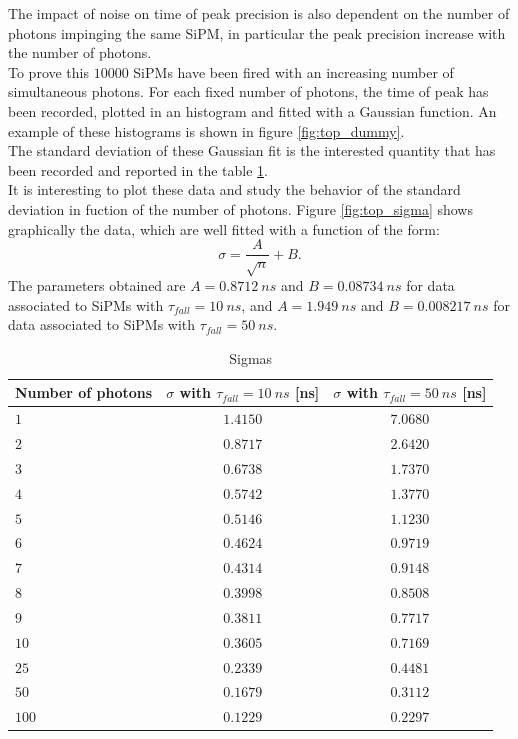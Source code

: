 The impact of noise on time of peak precision is also dependent on the number of photons impinging the same SiPM, in particular the peak precision increase with the number of photons.\\
To prove this $10000$ SiPMs have been fired with an increasing number of simultaneous photons. For each fixed number of photons, the time of peak has been recorded, plotted in an histogram and fitted with a Gaussian function. An example of these histograms is shown in figure \ref{fig:top_dummy}.\\

The standard deviation of these Gaussian fit is the interested quantity that has been recorded and reported in the table \ref{tab:sigmas}.\\
It is interesting to plot these data and study the behavior of the standard deviation in fuction of the number of photons. Figure \ref{fig:top_sigma} shows graphically the data, which are well fitted with a function of the form:
\begin{equation}
	\sigma = \frac{A}{\sqrt{n}} + B.
\end{equation}
The parameters obtained are $A = 0.8712\ ns$ and $B = 0.08734\ ns$ for data associated to SiPMs with $\tau_{fall}=10\ ns$, and $A = 1.949\ ns$ and $B = 0.008217\ ns$ for data associated to SiPMs with $\tau_{fall}=50\ ns$.

\begin{table}
	\centering
	\begin{tabular}{lcc}
		\toprule
		Number of photons	& $\sigma$ with $\tau_{fall}=10\ ns$ [ns] & $\sigma$ with $\tau_{fall}=50\ ns$ [ns]	\\
		\midrule
		$1$ 	& $1.4150$ & $7.0680$ \\
		$2$ 	& $0.8717$ & $2.6420$ \\
		$3$ 	& $0.6738$ & $1.7370$ \\
		$4$ 	& $0.5742$ & $1.3770$ \\
		$5$ 	& $0.5146$ & $1.1230$ \\
		$6$ 	& $0.4624$ & $0.9719$ \\
		$7$ 	& $0.4314$ & $0.9148$ \\
		$8$ 	& $0.3998$ & $0.8508$ \\
		$9$ 	& $0.3811$ & $0.7717$ \\
		$10$ 	& $0.3605$ & $0.7169$ \\
		$25$ 	& $0.2339$ & $0.4481$ \\
		$50$ 	& $0.1679$ & $0.3112$ \\
		$100$ 	& $0.1229$ & $0.2297$ \\
		\bottomrule
	\end{tabular}
	\caption{Sigmas}
	\label{tab:sigmas}
\end{table}

